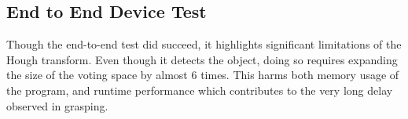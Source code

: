 \subsection{End to End Device Test}

Though the end-to-end test did succeed, it highlights significant limitations of the Hough transform.
Even though it detects the object, doing so requires expanding the size of the voting space by almost 6 times.
This harms both memory usage of the program, and runtime performance which contributes to the very long delay 
observed in grasping. 